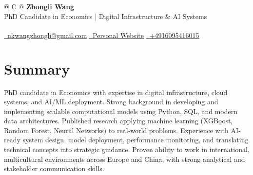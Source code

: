 \documentclass[a4paper,12pt]{article}
\begin{document}



\begin{tabularx}{\linewidth}{@{} C @{}}
\Huge{\textbf{Zhongli Wang}} \\[7.5pt]
PhD Candidate in Economics | Digital Infrastructure \& AI Systems \\
\\
\href{mailto:nkwangzhongli@gmail.com}{\raisebox{-0.05\height}\faEnvelope \ nkwangzhongli@gmail.com}\; %
\href{https://sites.google.com/view/zhongli-wang/}{\raisebox{-0.05\height}\faGlobe \ Personal Website}\; %
\href{tel:+4916095416015}{\raisebox{-0.05\height}\faMobile \ +4916095416015} \\


\end{tabularx}

\fancyfoot[R]{\small\textcolor{lightgray}{Updated: \today}}

\section{Summary}
PhD candidate in Economics with expertise in digital infrastructure, cloud systems, and AI/ML deployment. Strong background in developing and implementing scalable computational models using Python, SQL, and modern data architectures. Published research applying machine learning (XGBoost, Random Forest, Neural Networks) to real-world problems. Experience with AI-ready system design, model deployment, performance monitoring, and translating technical concepts into strategic guidance. Proven ability to work in international, multicultural environments across Europe and China, with strong analytical and stakeholder communication skills.
\end{document}
